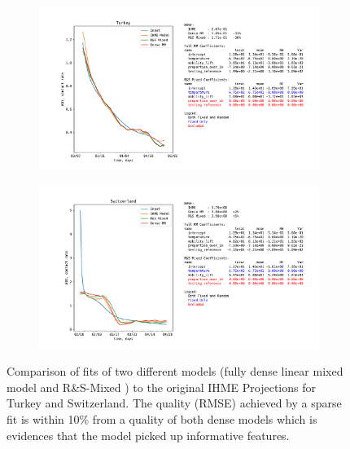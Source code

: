 \documentclass[11pt,letterpaper]{article}
\newcommand{\ouralgo}{R\&S-Mixed }
\numberwithin{equation}{section} %
\numberwithin{figure}{section} %
\numberwithin{table}{section} %
\begin{document}
\begin{figure}
	\begin{subfigure}[b]{\textwidth}
		\includegraphics[width=\textwidth]{Images/fit_Turkey}
	\end{subfigure}
	\begin{subfigure}[b]{\textwidth}
		\includegraphics[width=\textwidth]{Images/fit_Switzerland}	
	\end{subfigure}
	\caption{\label{fig:covid_feature_selection_2} Comparison of fits of two different models (fully dense linear mixed model and \ouralgo) to the original IHME Projections for Turkey and Switzerland. The quality (RMSE) achieved by a sparse fit is within 10\% from a quality of both dense models which is evidences that the model picked up informative features.}
\end{figure}
\end{document}
